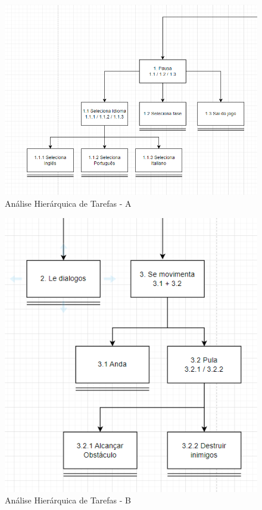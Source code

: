 \begin{figure}[h]
    \centering
    \includegraphics[width=\textwidth]{figuras/aht-a.png}
    \caption{Análise Hierárquica de Tarefas - A}
    \label{fig_analise_hierarquica_a}
\end{figure}
\begin{figure}[h]
    \centering
    \includegraphics[width=\textwidth]{figuras/aht-b.png}
    \caption{Análise Hierárquica de Tarefas - B}
    \label{fig_analise_hierarquica_b}
\end{figure}
